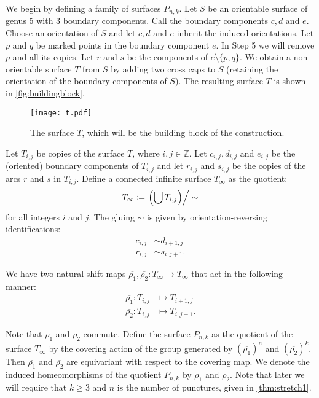 

We begin by defining a family of surfaces $P_{n,k}$. Let $S$ be an orientable surface of genus 5 with 3
boundary components.  Call the boundary components $c,d$ and $e$. Choose an orientation of $S$ and let $c,d$ and $e$ inherit the induced orientations. Let $p$ and $q$ be marked points in the boundary component $e$. In Step 5 we will remove $p$ and all its copies.  Let  $r$ and
$s$ be the components of $e\setminus\{p,q\}$. We obtain a non-orientable surface $T$ from $S$ by adding two cross caps to $S$ (retaining the orientation of the boundary components of $S$).  The resulting surface $T$ is shown in \autoref{fig:buildingblock}.

\begin{figure}[ht]
    \centering
    \texttt{[image: t.pdf]}
    \caption{The surface $T$, which will be the building block of the construction.}
    \label{fig:buildingblock}
\end{figure}

Let $T_{i,j}$ be copies of the surface $T$, where $i,j \in \mathbb{Z}$. Let $c_{i,j}, d_{i,j}$ and $e_{i,j}$ be the (oriented) boundary components of $T_{i,j}$ and let $r_{i,j}$ and $s_{i,j}$ be the copies of the arcs $r$ and $s$ in $T_{i,j}$. Define a connected infinite surface $T_\infty$ as the quotient:
\begin{align*}
  T_\infty \coloneqq \left. \left( \bigcup T_{i,j} \right)\right/\sim
\end{align*}
for all integers $i$ and $j$. The gluing $\sim$ is given by orientation-reversing identifications:
\begin{align}
  c_{i,j} &\sim d_{i+1,j} \label{identification1}\\
  r_{i,j} &\sim s_{i,j+1}.\label{identification2}
\end{align}

We have two
natural shift maps $\overline{\rho_1},\overline{\rho_2}: T_\infty \to T_\infty$ that act in the
following manner:
\begin{align*}
  \overline{\rho_1}: T_{i,j} &\mapsto T_{i+1, j} \\
  \overline{\rho_2}: T_{i,j} &\mapsto T_{i, j+1}.
\end{align*}

Note that $\overline{\rho_1}$ and $\overline{\rho_2}$ commute. Define the surface $P_{n,k}$ as the quotient of the surface $T_\infty$ by the
covering action of the group generated by $(\overline{\rho_1})^n$ and $(\overline{\rho_2})^k$. Then
$\overline{\rho_1}$ and $\overline{\rho_2}$ are equivariant with respect to the covering map.  We denote the induced homeomorphisms of the quotient $P_{n,k}$ by $\rho_1$
and $\rho_2$.  Note that later we will require that $k\geq 3$ and $n$ is the number of punctures, given in \autoref{thm:stretch1}.

